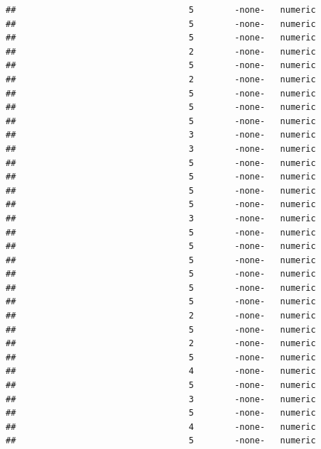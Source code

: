 \documentclass[
  12pt,
]{article}
\begin{document}
\begin{verbatim}
##                                  5        -none-   numeric                    
##                                  5        -none-   numeric                    
##                                  5        -none-   numeric                    
##                                  2        -none-   numeric                    
##                                  5        -none-   numeric                    
##                                  2        -none-   numeric                    
##                                  5        -none-   numeric                    
##                                  5        -none-   numeric                    
##                                  5        -none-   numeric                    
##                                  3        -none-   numeric                    
##                                  3        -none-   numeric                    
##                                  5        -none-   numeric                    
##                                  5        -none-   numeric                    
##                                  5        -none-   numeric                    
##                                  5        -none-   numeric                    
##                                  3        -none-   numeric                    
##                                  5        -none-   numeric                    
##                                  5        -none-   numeric                    
##                                  5        -none-   numeric                    
##                                  5        -none-   numeric                    
##                                  5        -none-   numeric                    
##                                  5        -none-   numeric                    
##                                  2        -none-   numeric                    
##                                  5        -none-   numeric                    
##                                  2        -none-   numeric                    
##                                  5        -none-   numeric                    
##                                  4        -none-   numeric                    
##                                  5        -none-   numeric                    
##                                  3        -none-   numeric                    
##                                  5        -none-   numeric                    
##                                  4        -none-   numeric                    
##                                  5        -none-   numeric                    

\end{verbatim}
\end{document}
